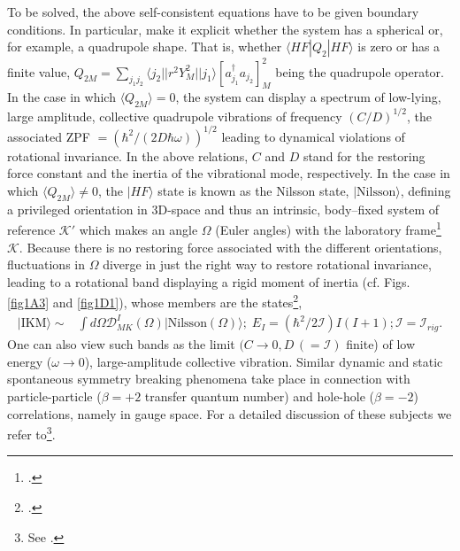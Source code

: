 To be solved, the above self-consistent equations have to be given boundary conditions. In particular, make it explicit whether the system has a spherical or, for example, a quadrupole  shape.   That is, whether $\langle HF|Q_2|HF\rangle$ is zero or has a finite value, $Q_{2M}=\sum_{j_1j_2}\langle j_2||r^2Y^2_M||j_1\rangle \left[a^\dagger_{j_1}a_{j_2}\right]^2_M$ being the quadrupole operator.  In the case in which $\langle Q_{2M}\rangle=0$, the system can display a spectrum of low-lying, large amplitude, collective quadrupole vibrations of frequency $(C/D)^{1/2}$, the associated ZPF $=\left(\hbar^2/(2D\hbar\omega)\right)^{1/2}$ leading to dynamical violations of rotational invariance. In the above relations, $C$ and $D$ stand for the restoring force constant and the inertia of the vibrational mode, respectively. In the case in which $\langle Q_{2M}\rangle\neq0$, the $|HF\rangle$ state is known as the Nilsson state, $|\text{Nilsson}\rangle$, defining a privileged orientation in 3D-space and thus an intrinsic, body--fixed system of reference $\mathcal{K}'$ which makes an angle $\Omega$ (Euler angles) with the laboratory frame\footnote{\cite{Nilsson:55}.} $\mathcal{K}$. Because there is no restoring force associated with the different orientations, fluctuations in $\Omega$ diverge in just the right way to restore rotational invariance, leading to a rotational band displaying a rigid moment of inertia (cf. Figs. \ref{fig1A3} and \ref{fig1D1}),  whose members are the states\footnote{\cite{Bohr:75}.},
 \begin{equation}\label{eq2.4.3}
\begin{split}
|\text{IKM}\rangle\sim&\int d\Omega \mathcal{D}_{MK}^I(\Omega)|\text{Nilsson}(\Omega)\rangle;\; E_I=(\hbar^2/2\mathcal I)I(I+1); \mathcal{I}=\mathcal{I}_{rig}.
\end{split}
\end{equation}
One can also view such bands as the limit $(C\rightarrow 0, D\,(=\mathcal I)$ finite) of low energy ($\omega\rightarrow 0$), large-amplitude collective vibration. 
Similar dynamic and static spontaneous symmetry breaking phenomena take place in connection with particle-particle ($\beta=+2$ transfer quantum number) and hole-hole ($\beta=-2$) correlations, namely in gauge space. For a detailed discussion of these subjects we refer to\footnote{See \cite{Bes:90}.}.





